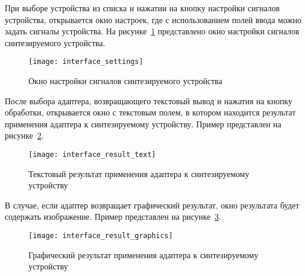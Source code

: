 \documentclass[document.tex]{subfiles}
\begin{document}
\clearpage
При выборе устройства из списка и нажатии на кнопку настройки сигналов
устройства, открывается окно настроек, где с использованием полей ввода можно
задать сигналы устройства. На рисунке~\ref{fig:interface_settings} представлено
окно настройки сигналов синтезируемого устройства.

\begin{figure}[here]
\texttt{[image: interface\_settings]}
\caption{Окно настройки сигналов синтезируемого устройства}
\label{fig:interface_settings}
\end{figure}

\clearpage

После выбора адаптера, возвращающего текстовый вывод и нажатия на кнопку
обработки, открывается окно с текстовым полем, в котором находится результат
применения адаптера к синтезируемому устройству. Пример представлен на 
рисунке~\ref{fig:interface_result_text}.

\begin{figure}[here]
\texttt{[image: interface\_result\_text]}
\caption{Текстовый результат применения адаптера к синтезируемому устройству}
\label{fig:interface_result_text}
\end{figure}

\clearpage

В случае, если адаптер возвращает графический результат, окно результата будет
содержать изображение. Пример представлен на 
рисунке~\ref{fig:interface_result_graphics}.

\begin{figure}[here]
\texttt{[image: interface\_result\_graphics]}
\caption{Графический результат применения адаптера к синтезируемому устройству}
\label{fig:interface_result_graphics}
\end{figure}

\clearpage
\end{document}
